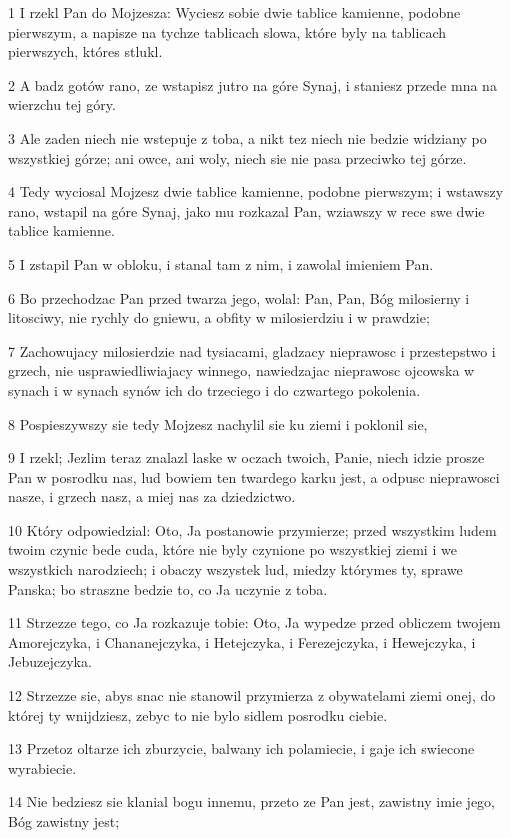 \par 1 I rzekl Pan do Mojzesza: Wyciesz sobie dwie tablice kamienne, podobne pierwszym, a napisze na tychze tablicach slowa, które byly na tablicach pierwszych, któres stlukl.
\par 2 A badz gotów rano, ze wstapisz jutro na góre Synaj, i staniesz przede mna na wierzchu tej góry.
\par 3 Ale zaden niech nie wstepuje z toba, a nikt tez niech nie bedzie widziany po wszystkiej górze; ani owce, ani woly, niech sie nie pasa przeciwko tej górze.
\par 4 Tedy wyciosal Mojzesz dwie tablice kamienne, podobne pierwszym; i wstawszy rano, wstapil na góre Synaj, jako mu rozkazal Pan, wziawszy w rece swe dwie tablice kamienne.
\par 5 I zstapil Pan w obloku, i stanal tam z nim, i zawolal imieniem Pan.
\par 6 Bo przechodzac Pan przed twarza jego, wolal: Pan, Pan, Bóg milosierny i litosciwy, nie rychly do gniewu, a obfity w milosierdziu i w prawdzie;
\par 7 Zachowujacy milosierdzie nad tysiacami, gladzacy nieprawosc i przestepstwo i grzech, nie usprawiedliwiajacy winnego, nawiedzajac nieprawosc ojcowska w synach i w synach synów ich do trzeciego i do czwartego pokolenia.
\par 8 Pospieszywszy sie tedy Mojzesz nachylil sie ku ziemi i poklonil sie,
\par 9 I rzekl; Jezlim teraz znalazl laske w oczach twoich, Panie, niech idzie prosze Pan w posrodku nas, lud bowiem ten twardego karku jest, a odpusc nieprawosci nasze, i grzech nasz, a miej nas za dziedzictwo.
\par 10 Który odpowiedzial: Oto, Ja postanowie przymierze; przed wszystkim ludem twoim czynic bede cuda, które nie byly czynione po wszystkiej ziemi i we wszystkich narodziech; i obaczy wszystek lud, miedzy którymes ty, sprawe Panska; bo straszne bedzie to, co Ja uczynie z toba.
\par 11 Strzezze tego, co Ja rozkazuje tobie: Oto, Ja wypedze przed obliczem twojem Amorejczyka, i Chananejczyka, i Hetejczyka, i Ferezejczyka, i Hewejczyka, i Jebuzejczyka.
\par 12 Strzezze sie, abys snac nie stanowil przymierza z obywatelami ziemi onej, do której ty wnijdziesz, zebyc to nie bylo sidlem posrodku ciebie.
\par 13 Przetoz oltarze ich zburzycie, balwany ich polamiecie, i gaje ich swiecone wyrabiecie.
\par 14 Nie bedziesz sie klanial bogu innemu, przeto ze Pan jest, zawistny imie jego, Bóg zawistny jest;
